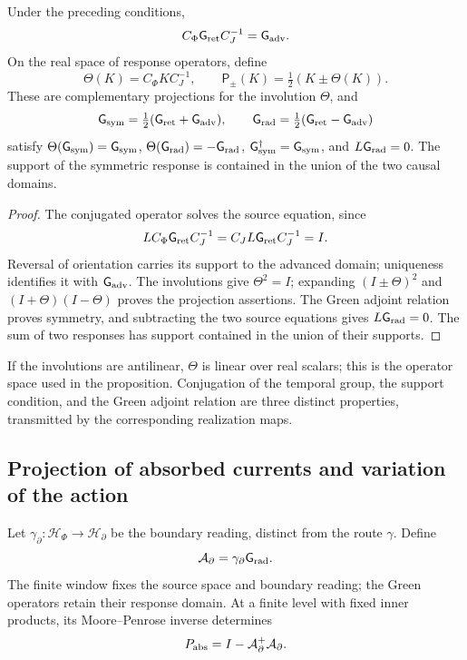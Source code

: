 \begin{proposition}
\label{vii:prop:green-paridades}
Under the preceding conditions,
\[
 C_\Phi \mathsf{G}_{\rm ret}C_J^{-1}=\mathsf{G}_{\rm adv}.
\]
On the real space of response operators, define
\[
 \Theta(K)=C_\Phi K C_J^{-1},\qquad
 \mathsf P_\pm(K)=\tfrac12(K\pm\Theta(K)).
\]
These are complementary projections for the involution \(\Theta\), and
\begin{equation}
 \mathsf{G}_{\rm sym}=\tfrac12(\mathsf{G}_{\rm ret}+\mathsf{G}_{\rm adv}),\qquad
 \mathsf{G}_{\rm rad}=\tfrac12(\mathsf{G}_{\rm ret}-\mathsf{G}_{\rm adv})
 \label{vii:eq:descomposicion-green}
\end{equation}
satisfy \(\Theta(\mathsf{G}_{\rm sym})=\mathsf{G}_{\rm sym}\),
\(\Theta(\mathsf{G}_{\rm rad})=-\mathsf{G}_{\rm rad}\),
\(\mathsf{G}_{\rm sym}^{\dagger}=\mathsf{G}_{\rm sym}\), and
\(L\mathsf{G}_{\rm rad}=0\). The support of the symmetric response is contained
in the union of the two causal domains.
\end{proposition}
\begin{proof}
The conjugated operator solves the source equation, since
\[
 LC_\Phi \mathsf{G}_{\rm ret}C_J^{-1}=C_JL\mathsf{G}_{\rm ret}C_J^{-1}=I.
\]
Reversal of orientation carries its support to the advanced domain;
uniqueness identifies it with \(\mathsf{G}_{\rm adv}\). The involutions give
\(\Theta^2=I\); expanding \((I\pm\Theta)^2\) and
\((I+\Theta)(I-\Theta)\) proves the projection assertions.
The Green adjoint relation proves symmetry, and subtracting the two source
equations gives \(L\mathsf{G}_{\rm rad}=0\). The sum of two responses has support
contained in the union of their supports.
\end{proof}

If the involutions are antilinear, \(\Theta\) is linear over real
scalars; this is the operator space used in the proposition.
Conjugation of the temporal group, the support condition, and the Green
adjoint relation are three distinct properties, transmitted by the
corresponding realization maps.

\subsection{Projection of absorbed currents and variation of the action}
\label{vii:subsec:proyeccion-absorcion}

Let \(\gamma_\partial:\mathcal H_\Phi\to\mathcal H_\partial\)
be the boundary reading, distinct from the route \(\gamma\). Define
\[
 \mathcal A_\partial=\gamma_\partial \mathsf{G}_{\rm rad}.
\]
The finite window fixes the source space and boundary reading;
the Green operators retain their response domain. At a finite level with
fixed inner products, its Moore--Penrose inverse determines
\begin{equation}
 P_{\rm abs}=I-\mathcal A_\partial^+\mathcal A_\partial.
 \label{vii:eq:proyector-absorcion}
\end{equation}

